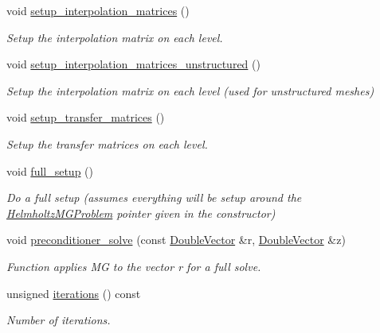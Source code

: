 \begin{DoxyCompactItemize}
void \hyperlink{classoomph_1_1HelmholtzMGPreconditioner_a5df19abf7f40f713d709273843260bab}{setup\+\_\+interpolation\+\_\+matrices} ()
\begin{DoxyCompactList}\small\item\em Setup the interpolation matrix on each level. \end{DoxyCompactList}\item 
void \hyperlink{classoomph_1_1HelmholtzMGPreconditioner_ac392a7156bbf904f7c5ec1c4ed3d4b96}{setup\+\_\+interpolation\+\_\+matrices\+\_\+unstructured} ()
\begin{DoxyCompactList}\small\item\em Setup the interpolation matrix on each level (used for unstructured meshes) \end{DoxyCompactList}\item 
void \hyperlink{classoomph_1_1HelmholtzMGPreconditioner_a8a02de0cfbfcf01aabb7201aeaf0fd85}{setup\+\_\+transfer\+\_\+matrices} ()
\begin{DoxyCompactList}\small\item\em Setup the transfer matrices on each level. \end{DoxyCompactList}\item 
void \hyperlink{classoomph_1_1HelmholtzMGPreconditioner_a5fa312e5c0b1dc263172010c78f3279c}{full\+\_\+setup} ()
\begin{DoxyCompactList}\small\item\em Do a full setup (assumes everything will be setup around the \hyperlink{classoomph_1_1HelmholtzMGProblem}{Helmholtz\+M\+G\+Problem} pointer given in the constructor) \end{DoxyCompactList}\item 
void \hyperlink{classoomph_1_1HelmholtzMGPreconditioner_a20e891e7a2d84f81fc56a003d7f2925f}{preconditioner\+\_\+solve} (const \hyperlink{classoomph_1_1DoubleVector}{Double\+Vector} \&r, \hyperlink{classoomph_1_1DoubleVector}{Double\+Vector} \&z)
\begin{DoxyCompactList}\small\item\em Function applies MG to the vector r for a full solve. \end{DoxyCompactList}\item 
unsigned \hyperlink{classoomph_1_1HelmholtzMGPreconditioner_a5493abcc56c45c927d918d097f747957}{iterations} () const
\begin{DoxyCompactList}\small\item\em Number of iterations. \end{DoxyCompactList}\item 

\end{DoxyCompactItemize}
